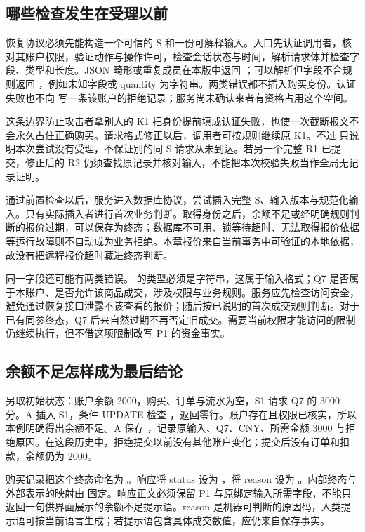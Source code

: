 \subsection*{哪些检查发生在受理以前}

恢复协议必须先能构造一个可信的 S 和一份可解释输入。入口先认证调用者，核对其账户权限，验证动作与操作许可，检查会话状态与时间，解析请求体并检查字段、类型和长度。JSON 畸形或重复成员在本版中返回 ；可以解析但字段不合规则返回 ，例如未知字段或 quantity 为字符串。两类错误都不插入购买身份。认证失败也不向  写一条该账户的拒绝记录；服务尚未确认来者有资格占用这个空间。

这条边界防止攻击者拿别人的 K1 把身份提前填成认证失败，也使一次截断报文不会永久占住正确购买。请求格式修正以后，调用者可按规则继续原 K1。不过  只说明本次尝试没有受理，不保证别的同 S 请求从未到达。若另一个完整 R1 已提交，修正后的 R2 仍须查找原记录并核对输入，不能把本次校验失败当作全局无记录证明。

通过前置检查以后，服务进入数据库协议，尝试插入完整 S、输入版本与规范化输入。只有实际插入者进行首次业务判断。取得身份之后，余额不足或经明确规则判断的报价过期，可以保存为终态；数据库不可用、锁等待超时、无法取得报价依据等运行故障则不自动成为业务拒绝。本章报价来自当前事务中可验证的本地依据，故没有把远程报价超时藏进终态判断。



同一字段还可能有两类错误。 的类型必须是字符串，这属于输入格式；Q7 是否属于本账户、是否允许该商品成交，涉及权限与业务规则。服务应先检查访问安全，避免通过恢复接口泄露不该查看的报价；随后按已说明的首次成交规则判断。对于已有同参终态，Q7 后来自然过期不再否定旧成交。需要当前权限才能访问的限制仍继续执行，但不借这项限制改写 P1 的资金事实。

\subsection*{余额不足怎样成为最后结论}

另取初始状态：账户余额 2000，购买、订单与流水为空，S1 请求 Q7 的 3000 分。A 插入 S1，条件 UPDATE 检查 ，返回零行。账户存在且权限已核实，所以本例明确得出余额不足。A 保存 ，记录原输入、Q7、CNY、所需金额 3000 与拒绝原因。在这段历史中，拒绝提交以前没有其他账户变化；提交后没有订单和扣款，余额仍为 2000。

购买记录把这个终态命名为 。响应将 status 设为 ，将 reason 设为 。内部终态与外部表示的映射由  固定。响应正文必须保留 P1 与原绑定输入所需字段，不能只返回一句供界面展示的余额不足提示语。reason 是机器可判断的原因码，人类提示语可按当前语言生成；若提示语包含具体成交数值，应仍来自保存事实。

